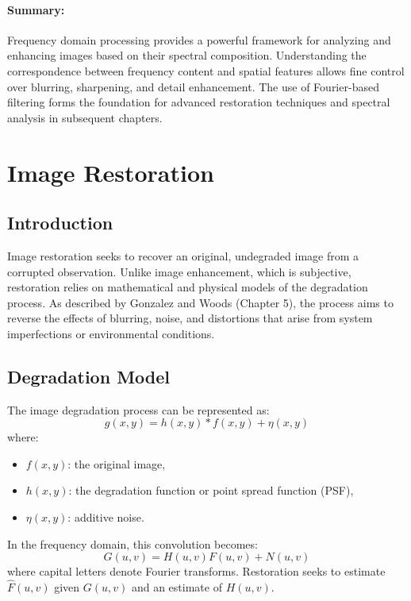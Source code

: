 \documentclass[12pt,a4paper]{AnantDocumentation}
\begin{document}
\paragraph{Summary:} Frequency domain processing provides a powerful framework for analyzing and enhancing images based on their spectral composition. Understanding the correspondence between frequency content and spatial features allows fine control over blurring, sharpening, and detail enhancement. The use of Fourier-based filtering forms the foundation for advanced restoration techniques and spectral analysis in subsequent chapters.

\section{Image Restoration}

\subsection{Introduction}
Image restoration seeks to recover an original, undegraded image from a corrupted observation. Unlike image enhancement, which is subjective, restoration relies on mathematical and physical models of the degradation process. As described by Gonzalez and Woods (Chapter 5), the process aims to reverse the effects of blurring, noise, and distortions that arise from system imperfections or environmental conditions.

\subsection{Degradation Model}
The image degradation process can be represented as:
\begin{equation}
g(x,y) = h(x,y) * f(x,y) + \eta(x,y)
\end{equation}
where:
\begin{itemize}
\item $f(x,y)$: the original image,
\item $h(x,y)$: the degradation function or point spread function (PSF),
\item $\eta(x,y)$: additive noise.
\end{itemize}

In the frequency domain, this convolution becomes:
\begin{equation}
G(u,v) = H(u,v)F(u,v) + N(u,v)
\end{equation}
where capital letters denote Fourier transforms. Restoration seeks to estimate $\hat{F}(u,v)$ given $G(u,v)$ and an estimate of $H(u,v)$.
\end{document}
